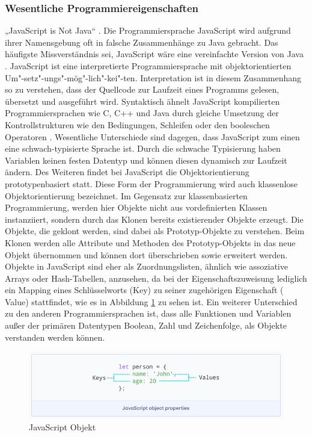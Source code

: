 \subsubsection{Wesentliche Programmiereigenschaften}
„JavaScript is Not Java“  \cite{JS1.091}. Die Programmiersprache JavaScript wird aufgrund ihrer Namensgebung oft in falsche Zusammenhänge zu Java gebracht. Das häufigste Missverständnis sei, JavaScript wäre eine vereinfachte Version von Java \cite{JS1.091}.
\newline
\noindent
JavaScript ist eine interpretierte Programmiersprache mit objektorientierten Um"-setz"-ungs"-mög"-lich"-kei"-ten. Interpretation ist in diesem Zusammenhang so zu verstehen, dass der Quellcode zur Laufzeit eines Programms gelesen, übersetzt und ausgeführt wird.
Syntaktisch ähnelt JavaScript kompilierten Programmiersprachen wie C, C++ und Java durch gleiche Umsetzung der Kontrollstrukturen wie den Bedingungen, Schleifen oder den booleschen Operatoren \cite{JS1.1}.
Wesentliche Unterschiede sind dagegen, dass JavaScript zum einen eine schwach-typisierte Sprache ist.
Durch die schwache Typisierung haben Variablen keinen festen Datentyp und können diesen dynamisch zur Laufzeit ändern.
Des Weiteren findet bei JavaScript die Objektorientierung prototypenbasiert statt. Diese Form der Programmierung wird auch klassenlose Objektorientierung bezeichnet.
Im Gegensatz zur klassenbasierten Programmierung, werden hier Objekte nicht aus vordefinierten Klassen instanziiert, sondern durch das Klonen bereits existierender Objekte erzeugt.
Die Objekte, die geklont werden, sind dabei als Prototyp-Objekte zu ver\-steh\-en.
Beim Klonen werden alle Attribute und Methoden des Prototyp-Objekts in das neue Objekt übernommen und können dort überschrieben sowie erweitert werden.
Objekte in JavaScript sind eher als Zuordnungslisten, ähnlich wie assoziative Arrays oder Hash-Tabellen, anzusehen, da bei der Eigenschaftszuweisung lediglich ein Mapping eines Schlüsselworts (Key) zu seiner zugehörigen Eigenschaft ( Value) stattfindet, wie es in Abbildung \ref{fig:JavascriptObjekt} zu sehen ist.
\newline
\noindent
Ein weiterer Unterschied zu den anderen Programmiersprachen ist, dass alle Funktionen und Variablen außer der primären Datentypen Boolean, Zahl und Zeichenfolge, als Objekte verstanden werden können.\\

\begin{figure}[tbt]
\centering
\includegraphics[width=\textwidth]{images/JavaScript_Object.PNG}
\caption[JavaScript Objekt]{JavaScript Objekt \cite{JS1.29}}
\label{fig:JavascriptObjekt}
\end{figure}

